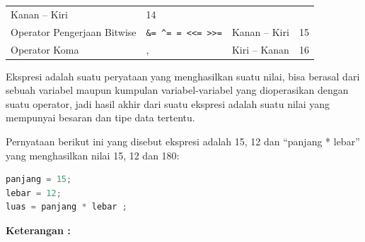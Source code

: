 \begin{longtable}[]{@{}llll@{}}
\begin{minipage}[t]{0.14\columnwidth}
Kanan -- Kiri
\strut\end{minipage} &
\begin{minipage}[t]{0.05\columnwidth}\raggedright\strut
14
\strut\end{minipage}\tabularnewline
\begin{minipage}[t]{0.52\columnwidth}\raggedright\strut
Operator Pengerjaan Bitwise
\strut\end{minipage} &
\begin{minipage}[t]{0.17\columnwidth}\raggedright\strut
\texttt{\&=\ \^{}=\ \textbar{}=\ \textless{}\textless{}=\ \textgreater{}\textgreater{}=}
\strut\end{minipage} &
\begin{minipage}[t]{0.14\columnwidth}\raggedright\strut
Kanan -- Kiri
\strut\end{minipage} &
\begin{minipage}[t]{0.05\columnwidth}\raggedright\strut
15
\strut\end{minipage}\tabularnewline
\begin{minipage}[t]{0.52\columnwidth}\raggedright\strut
Operator Koma
\strut\end{minipage} &
\begin{minipage}[t]{0.17\columnwidth}\raggedright\strut
,
\strut\end{minipage} &
\begin{minipage}[t]{0.14\columnwidth}\raggedright\strut
Kiri -- Kanan
\strut\end{minipage} &
\begin{minipage}[t]{0.05\columnwidth}\raggedright\strut
16
\strut\end{minipage}\tabularnewline
\bottomrule
\end{longtable}

Ekspresi adalah suatu peryataan yang menghasilkan suatu nilai, bisa
berasal dari sebuah variabel maupun kumpulan variabel-variabel yang
dioperasikan dengan suatu operator, jadi hasil akhir dari suatu ekspresi
adalah suatu nilai yang mempunyai besaran dan tipe data tertentu.

Pernyataan berikut ini yang disebut ekspresi adalah 15, 12 dan ``panjang
* lebar'' yang menghasilkan nilai 15, 12 dan 180:

\begin{lstlisting}[language=c++, numbers=none]
panjang = 15;
lebar = 12;
luas = panjang * lebar ;
\end{lstlisting}

\textbf{Keterangan :}

